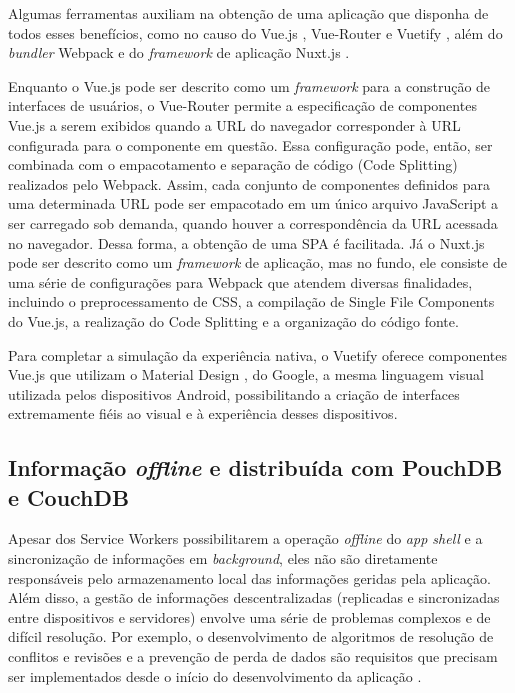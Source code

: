 \documentclass[
	article,			%
	11pt,				%
	oneside,			%
	a4paper,			%
	english,			%
	brazil,				%
	sumario=tradicional
	]{abntex2}
\begin{document}
Algumas ferramentas auxiliam na obtenção de uma aplicação que disponha de todos esses benefícios, como no causo do Vue.js \cite{vuejs-2017}, Vue-Router \cite{vuerouter-2017} e Vuetify \cite{vuetify-2017}, além do \textit{bundler} Webpack \cite{webpack-2017} e do \textit{framework} de aplicação Nuxt.js \cite{nuxt-2017}.

Enquanto o Vue.js pode ser descrito como um \textit{framework} para a construção de interfaces de usuários, o Vue-Router permite a especificação de componentes Vue.js a serem exibidos quando a URL do navegador corresponder à URL configurada para o componente em questão. Essa configuração pode, então, ser combinada com o empacotamento e separação de código (Code Splitting) realizados pelo Webpack. Assim, cada conjunto de componentes definidos para uma determinada URL pode ser empacotado em um único arquivo JavaScript a ser carregado sob demanda, quando houver a correspondência da URL acessada no navegador. Dessa forma, a obtenção de uma SPA é facilitada. Já o Nuxt.js pode ser descrito como um \textit{framework} de aplicação, mas no fundo, ele consiste de uma série de configurações para Webpack que atendem diversas finalidades, incluindo o preprocessamento de CSS, a compilação de Single File Components do Vue.js, a realização do Code Splitting e a organização do código fonte.

Para completar a simulação da experiência nativa, o Vuetify oferece componentes Vue.js que utilizam o Material Design \cite{material-design-2018}, do Google, a mesma linguagem visual utilizada pelos dispositivos Android, possibilitando a criação de interfaces extremamente fiéis ao visual e à experiência desses dispositivos.

\subsection{Informação \textit{offline} e distribuída com PouchDB e CouchDB}

Apesar dos Service Workers possibilitarem a operação \textit{offline} do \textit{app shell} e a sincronização de informações em \textit{background}, eles não são diretamente responsáveis pelo armazenamento local das informações geridas pela aplicação. Além disso, a gestão de informações descentralizadas (replicadas e sincronizadas entre dispositivos e servidores) envolve uma série de problemas complexos e de difícil resolução. Por exemplo, o desenvolvimento de algoritmos de resolução de conflitos e revisões e a prevenção de perda de dados são requisitos que precisam ser implementados desde o início do desenvolvimento da aplicação \cite{martynus-2017}.
\end{document}
